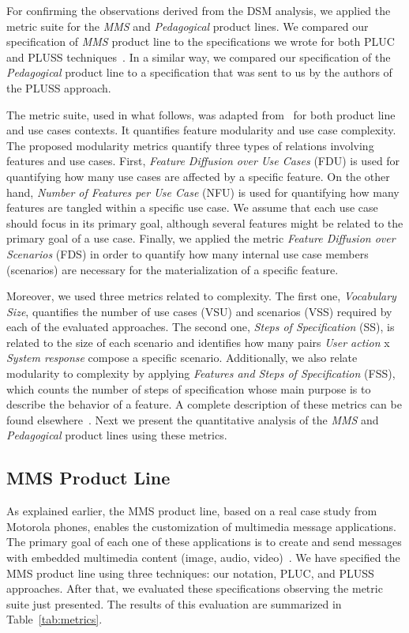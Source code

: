\documentclass[11pt]{report}
\begin{document}
For confirming the observations derived from the DSM analysis, we applied the metric suite for 
the \emph{MMS} and \emph{Pedagogical} product lines. We compared our specification of \emph{MMS} product line to the specifications we wrote for both PLUC and PLUSS techniques~\cite{spg-url}.  
In a similar way, we compared our specification of the \emph{Pedagogical} product line 
to a specification that was sent to us by the authors of the PLUSS approach. 

The metric suite, used in what follows, was adapted from~\cite{garcia-taosd-2005} for both product line 
and use cases contexts. It quantifies 
feature modularity and use case complexity. The proposed modularity 
metrics quantify three types of relations involving features and use cases.
First, \emph{Feature Diffusion over Use Cases} (FDU) is used for
quantifying how many use cases are affected by a specific
feature. On the other hand, \emph{Number of Features per Use Case} (NFU) is used for quantifying
how many features are tangled within a specific use
case. We assume that each use case should focus in
its primary goal, although several features might be related
to the primary goal of a use case. Finally, we applied
the metric \emph{Feature Diffusion over Scenarios} (FDS) in order
to quantify how many internal use case members (scenarios)
are necessary for the materialization of a specific feature.
 
Moreover, we used three metrics related to complexity.
The first one, \emph{Vocabulary Size}, quantifies the number of use
cases (VSU) and scenarios (VSS) required by each of the evaluated
approaches. The second one, \emph{Steps of Specification}
(SS), is related to the size of each scenario and identifies
how many pairs \emph{User action} x \emph{System response} compose a
specific scenario. Additionally, we also relate modularity to
complexity by applying \emph{Features and Steps of Specification}
(FSS), which counts the number of steps of specification
whose main purpose is to describe the behavior of a feature. 
A complete description of these metrics can be found elsewhere~\cite{rbonifacio-ea-2008}. Next we 
present the quantitative analysis of the \emph{MMS} and \emph{Pedagogical} product lines using these metrics.

\subsection{MMS Product Line}

As explained earlier, the MMS product line, based on a real case study from Motorola phones, enables the customization of 
multimedia message applications. The primary goal of each one of these applications is to create and 
send messages with embedded multimedia content (image, audio, video)~\cite{rbonifacio-ea-2008}. 
We have specified the MMS product line using three techniques: our notation, PLUC, and PLUSS approaches. After that, we evaluated these specifications observing the metric suite just presented. The results of this evaluation are summarized in Table~\ref{tab:metrics}. 
\end{document}
